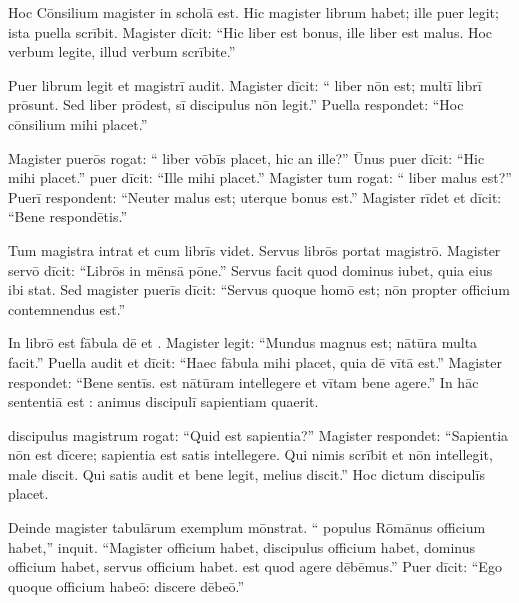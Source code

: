 \documentclass[12pt]{nextbook}
\begin{document}
\begin{readersection}{Hoc Cōnsilium}
 magister in scholā est. Hic magister librum habet; ille puer legit; ista puella scrībit. Magister dīcit: “Hic liber est bonus, ille liber est malus. Hoc verbum legite, illud verbum scrībite.”

Puer librum legit et  magistrī audit. Magister dīcit: “ liber nōn  est; multī librī prōsunt. Sed  liber prōdest, sī discipulus nōn legit.” Puella respondet: “Hoc cōnsilium mihi placet.”

Magister puerōs rogat: “ liber vōbīs placet, hic an ille?” Ūnus puer dīcit: “Hic mihi placet.”  puer dīcit: “Ille mihi placet.” Magister tum rogat: “ liber malus est?” Puerī respondent: “Neuter malus est; uterque bonus est.” Magister rīdet et dīcit: “Bene respondētis.”

Tum magistra intrat et  cum librīs videt. Servus librōs portat  magistrō. Magister servō dīcit: “Librōs in mēnsā pōne.” Servus facit quod dominus iubet, quia  eius ibi stat. Sed magister puerīs dīcit: “Servus quoque homō est; nōn propter officium contemnendus est.”

In librō est fābula dē  et . Magister legit: “Mundus magnus est; nātūra multa facit.” Puella audit et dīcit: “Haec fābula mihi placet, quia dē vītā est.” Magister respondet: “Bene sentīs.  est nātūram intellegere et vītam bene agere.” In hāc sententiā est : animus discipulī sapientiam quaerit.

 discipulus magistrum rogat: “Quid est sapientia?” Magister respondet: “Sapientia nōn est  dīcere; sapientia est satis intellegere. Qui nimis scrībit et nōn intellegit, male discit. Qui satis audit et bene legit, melius discit.” Hoc dictum discipulīs placet.

Deinde magister tabulārum exemplum mōnstrat. “ populus Rōmānus officium habet,” inquit. “Magister officium habet, discipulus officium habet, dominus officium habet, servus officium habet.  est quod agere dēbēmus.” Puer dīcit: “Ego quoque officium habeō: discere dēbeō.”


\end{readersection}
\end{document}
